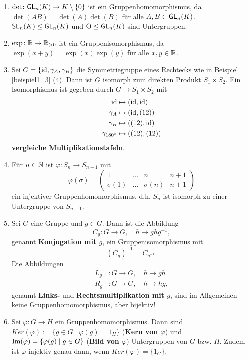 \begin{beispiel}\label{beispiel1_6}
	\begin{enumerate}
		\item $\det \colon \mathsf{GL}_n(K) \to K \setminus \{0\}$ ist ein Gruppenhomomorphismus, da $\det(AB) = \det(A)\det(B)$ für alle $A,B \in \mathsf{GL}_n(K)$. $\mathsf{SL}_n(K) \leq \mathsf{GL}_n(K)$ und $\mathrm{O} \leq \mathsf{GL}_n(K)$ sind Untergruppen.
		
		\item $\exp \colon \mathbb{R} \to \mathbb{R}_{>0}$ ist ein Gruppenisomorphismus, da $\exp(x+y) = \exp(x)\exp(y)$ für alle $x,y \in \mathbb{R}$.
		
		\item Sei $G = \{\mathrm{id}, \gamma_A, \gamma_B\}$ die Symmetriegruppe eines Rechtecks wie in Beispiel \ref{beispiel1_3} (4). Dann ist $G$ isomorph zum direkten Produkt $S_1 \times S_2$. Ein Isomorphismus ist gegeben durch $G \to S_1 \times S_2$ mit
		\begin{align*}
			\mathrm{id} &\mapsto (\mathrm{id}, \mathrm{id})\\
			\gamma_A &\mapsto (\mathrm{id}, (12))\\
			\gamma_B &\mapsto ((12), \mathrm{id})\\
			\gamma_{180^\circ} &\mapsto ((12), (12))
		\end{align*}
		\textbf{vergleiche Multiplikationstafeln}.
		
		\item Für $n \in \mathbb{N}$ ist $\varphi \colon S_n \to S_{n+1}$ mit 
		\[\varphi(\sigma) = \begin{pmatrix}
			1 & \dots & n & n+1\\
			\sigma(1) & \dots & \sigma(n) & n+1
		\end{pmatrix}\]
		ein injektiver Gruppenhomomorphismus, d.h. $S_n$ ist isomorph zu einer Untergruppe von $S_{n+1}$.
		
		\item Sei $G$ eine Gruppe und $g \in G$. Dann ist die Abbildung 
		\[C_g \colon G \to G, \quad h \mapsto ghg^{-1},\]
		genannt \textbf{Konjugation mit $g$}, ein Gruppenisomorphismus mit
		\[(C_g)^{-1} = C_{g^{-1}}.\]
		Die Abbildungen
		\begin{align*}
			L_g &\colon G \to G, \quad h \mapsto gh\\
			R_g &\colon G \to G, \quad h \mapsto hg,
		\end{align*}
		genannt \textbf{Links-} und \textbf{Rechtsmultiplikation mit $g$}, sind im Allgemeinen keine Gruppenhomomorphismus, aber bijektiv!
		
		\item Sei $\varphi \colon G \to H$ ein Gruppenhomomorphismus. Dann sind $Ker(\varphi) := \{g \in G \mid \varphi(g) = 1_H\}$ (\textbf{Kern von $\varphi$}) und $\mathrm{Im}(\varphi) = \{\varphi(g) \mid g \in G\}$ (\textbf{Bild von $\varphi$}) Untergruppen von $G$ bzw. $H$. Zudem ist $\varphi$ injektiv genau dann, wenn $Ker(\varphi) = \{1_G\}$.
		

\end{enumerate}
\end{beispiel}
